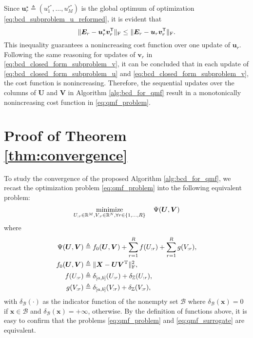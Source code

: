 Since $\bm{u}_r^\star \triangleq (u^{r^\star}_1,\dots,u^{r^\star}_M)$ is the global optimum of optimization \eqref{eq:bcd_subproblem_u_reformed}, it is evident that
\begin{equation}
    \|\bm{E}_r - \bm{u}_r^\star \bm{v}_r^\mathsf{T}\|_{\rm F}  \leq \|\bm{E}_r - \bm{u}_r \bm{v}_r^\mathsf{T}\|_{\rm F}.
\end{equation}
This inequality guarantees a nonincreasing cost function over one update of $\bm u_r$. Following the same reasoning for updates of $\bm v_r$ in \eqref{eq:bcd_closed_form_subproblem_v}, it can be concluded that in each update of \eqref{eq:bcd_closed_form_subproblem_u} and \eqref{eq:bcd_closed_form_subproblem_v}, the cost function is nonincreasing. Therefore, the sequential updates over the columns of $\bm U$ and $\bm V$ in Algorithm \ref{alg:bcd_for_qmf} result in a monotonically nonincreasing cost function in \eqref{eq:qmf_problem}.


\section{Proof of Theorem \ref{thm:convergence}} \label{app:convergence_proof}

To study the convergence of the proposed Algorithm \ref{alg:bcd_for_qmf}, we recast the optimization problem \eqref{eq:qmf_problem} into the following equivalent problem:
\begin{align}
    \begin{split}
        \operatorname*{minimize}_{U_{:r} \in \mathbb{R}^{M}, V_{:r} \in \mathbb{R}^{N}, \forall r\in\{1,...,R\}} \quad \Psi(\bm U, \bm V)
    \end{split}
    \label{eq:qmf_surrogate}
\end{align}
where
\begin{align*}
    \Psi(\bm U, \bm V) & \triangleq f_0(\bm U, \bm V) + \sum_{r=1}^R f(U_{:r}) + \sum_{r=1}^R g(V_{:r}), \\
    f_0(\bm U, \bm V)  & \triangleq \|\bm X - \bm U \bm V^{\rm T} \|_{\rm F}^2,                          \\
    f(U_{:r})          & \triangleq \delta_{[a,b]}(U_{:r}) + \delta_{\mathbb{Z}}(U_{:r}),                          \\
    g(V_{:r})          & \triangleq \delta_{[a,b]}(V_{:r}) + \delta_{\mathbb{Z}}(V_{:r}),
\end{align*}
with $\delta_\mathcal{B}(\cdot)$ as the indicator function of the nonempty set $\mathcal{B}$ where $\delta_\mathcal{B}(\bm x) = 0$ if $\bm x \in \mathcal{B}$ and $\delta_\mathcal{B}(\bm x) = +\infty$, otherwise. By the definition of functions above, it is easy to confirm that the problems \eqref{eq:qmf_problem} and \eqref{eq:qmf_surrogate} are equivalent.

